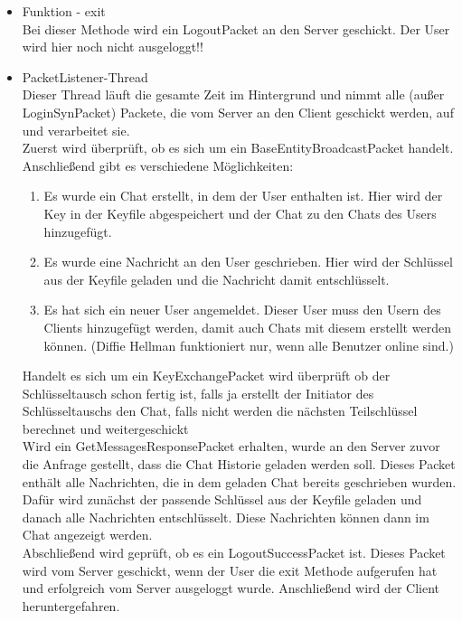 \begin{itemize}
    \item Funktion - exit \\
    Bei dieser Methode wird ein LogoutPacket an den Server geschickt. Der User wird hier noch nicht ausgeloggt!!
    
    \item PacketListener-Thread \\
    Dieser Thread läuft die gesamte Zeit im Hintergrund und nimmt alle (außer LoginSynPacket) Packete, die vom Server
    an den Client geschickt werden, auf und verarbeitet sie. \\
    Zuerst wird überprüft, ob es sich um ein BaseEntityBroadcastPacket handelt. Anschließend gibt es verschiedene
    Möglichkeiten: \\
    \begin{enumerate}
        \item Es wurde ein Chat erstellt, in dem der User enthalten ist. Hier wird der Key in der Keyfile abgespeichert
        und der Chat zu den Chats des Users hinzugefügt.
        \item Es wurde eine Nachricht an den User geschrieben. Hier wird der Schlüssel aus der Keyfile geladen und die
        Nachricht damit entschlüsselt.
        \item Es hat sich ein neuer User angemeldet. Dieser User muss den Usern des Clients hinzugefügt werden, damit auch
        Chats mit diesem erstellt werden können. (Diffie Hellman funktioniert nur, wenn alle Benutzer online sind.)
    \end{enumerate}
    
    Handelt es sich um ein KeyExchangePacket wird überprüft ob der Schlüsseltausch schon fertig ist,
    falls ja erstellt der Initiator des Schlüsseltauschs den Chat, falls nicht werden die nächsten
    Teilschlüssel berechnet und weitergeschickt \\
    
    Wird ein GetMessagesResponsePacket erhalten, wurde an den Server zuvor die Anfrage gestellt, dass die Chat Historie
    geladen werden soll. Dieses Packet enthält alle Nachrichten, die in dem geladen Chat bereits geschrieben wurden.
    Dafür wird zunächst der passende Schlüssel aus der Keyfile geladen und danach alle Nachrichten entschlüsselt.
    Diese Nachrichten können dann im Chat angezeigt werden. \\
    
    Abschließend wird geprüft, ob es ein LogoutSuccessPacket ist. Dieses Packet wird vom Server geschickt, wenn der
    User die exit Methode aufgerufen hat und erfolgreich vom Server ausgeloggt wurde. Anschließend wird der Client
    heruntergefahren.\\
    


\end{itemize}


